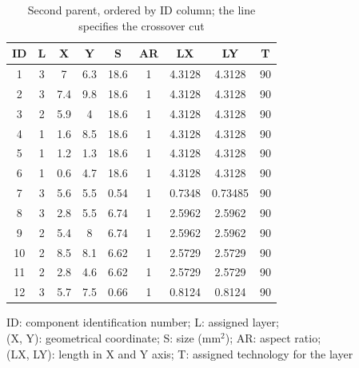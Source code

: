 \begin{table}[h!]
\caption{Second parent, ordered by ID column; the line specifies the crossover cut}
\begin{center}
\begin{scriptsize}
\begin{tabular}{|c|c|c|c|c|c|c|c|c|}
\hline ID & L & X & Y & S & AR & LX & LY & T\\
\hline 1 & 3 & 7 & 6.3 & 18.6 & 1 & 4.3128 & 4.3128 & 90\\
2 & 3 & 7.4 & 9.8 & 18.6 & 1 & 4.3128 & 4.3128 & 90\\
3 & 2 & 5.9 & 4 & 18.6 & 1 & 4.3128 & 4.3128 & 90\\
4 & 1 & 1.6 & 8.5 & 18.6 & 1 & 4.3128 & 4.3128 & 90\\
5 & 1 & 1.2 & 1.3 & 18.6 & 1 & 4.3128 & 4.3128 & 90\\
6 & 1 & 0.6 & 4.7 & 18.6 & 1 & 4.3128 & 4.3128 & 90\\
7 & 3 & 5.6 & 5.5 & 0.54 & 1 & 0.7348 & 0.73485 & 90\\
\hline
\hline
8 & 3 & 2.8 & 5.5 & 6.74 & 1 & 2.5962 & 2.5962 & 90\\
9 & 2 & 5.4 & 8 & 6.74 & 1 & 2.5962 & 2.5962 & 90\\
10 & 2 & 8.5 & 8.1 & 6.62 & 1 & 2.5729 & 2.5729 & 90\\
11 & 2 & 2.8 & 4.6 & 6.62 & 1 & 2.5729 & 2.5729 & 90\\
12 & 3 & 5.7 & 7.5 & 0.66 & 1 & 0.8124 & 0.8124 & 90\\
\hline
\end{tabular}
\end{scriptsize}
\end{center}
\begin{center}
\begin{scriptsize}
ID: component identification number; L: assigned layer;\\
(X, Y): geometrical coordinate; S: size (mm$^2$); AR: aspect ratio;\\
(LX, LY): length in X and Y axis; T: assigned technology for the layer
\end{scriptsize}
\end{center}
\label{tab:secondparentIDrow}
\end{table}

